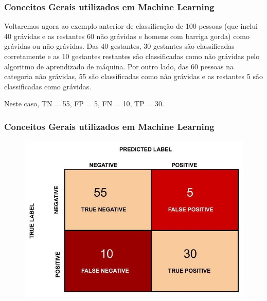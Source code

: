 \documentclass{beamer}
\begin{document}
\begin{frame}
	\frametitle{Conceitos Gerais utilizados em Machine Learning}
	Voltaremos agora ao exemplo anterior de classificação de 100 pessoas (que inclui 40 grávidas e as restantes 60 não grávidas e homens com barriga gorda) como grávidas ou não grávidas. Das 40 gestantes, 30 gestantes são classificadas corretamente e as 10 gestantes restantes são classificadas como não grávidas pelo algoritmo de aprendizado de máquina. Por outro lado, das 60 pessoas na categoria não grávidas, 55 são classificadas como não grávidas e as restantes 5 são classificadas como grávidas.
	
	Neste caso, TN = 55, FP = 5, FN = 10, TP = 30.
\end{frame}	
	
	
	


\begin{frame}
	\frametitle{Conceitos Gerais utilizados em Machine Learning}
	\begin{figure}
		\centering
		\includegraphics[width=0.7\linewidth]{figures/confusion_matrix_res}
	\end{figure}
\end{frame}	

\end{document}
